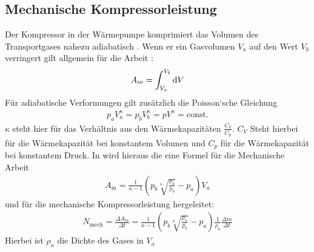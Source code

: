  \subsection{Mechanische Kompressorleistung}

Der Kompressor in der Wärmepumpe komprimiert das Volumen des Transportgases nahezu adiabatisch \cite[vgl.][]{man:v206}.
Wenn er ein Gasvolumen $V_a$ auf den Wert $V_b$ verringert gilt allgemein für die Arbeit \cite[vgl.][]{man:v206}:
\begin{align}
    A_m = \int_{V_a}^{V_b} \mathop{}\!\mathrm{d} V
\end{align}
Für adiabatische Verformungen gilt zusätzlich die Poisson`sche Gleichung
\begin{align}
    p_a V_{a}^{\kappa} = p_{b} V_{b}^{\kappa} = p V^{\kappa} = \mathrm{const.}
\end{align}
$\kappa$ steht hier für das Verhältnis aus den Wärmekapazitäten $\frac{C_V}{C_p}$.
$C_V$ Steht hierbei für die Wärmekapazität bei konstantem Volumen und $C_p$ für die Wärmekapazität bei konstantem Druck.
In \cite{man:v206} wird hieraus die eine Formel für die Mechanische Arbeit
\begin{align}
    A_{\text{m}} = \frac{1}{\kappa - 1} \left( p_b \sqrt[\kappa]{\frac{p_a}{p_b}} -p_a \right) V_a
\end{align}
und für die mechanische Kompressorleistung hergeleitet:
\begin{align}
    N_{\text{mech}} = \frac{\Delta A_m}{\Delta t} = \frac{1}{\kappa - 1}%
     \left(p_b \sqrt[\kappa]{\frac{p_a}{p_b}} - p_a \right) \frac{1}{\rho_{a}}\frac{\Delta m}{\Delta t}
\end{align}
Hierbei ist $\rho_a$ die Dichte des Gases in $V_a$